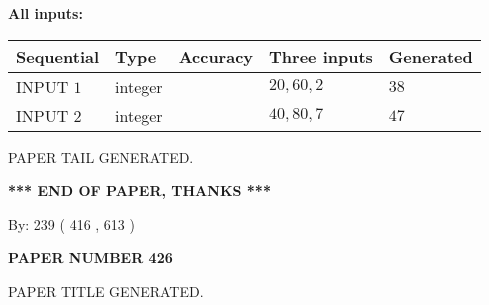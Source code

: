 \documentclass[12pt]{article}
\begin{document}
   
   
   
\noindent\vspace{0.1in}\hspace{-0.08in} {\textbf{\Large{All inputs: }}}
   
   
  
  
\noindent\begin{tabular}{|l|l|l|l|l|}
\hline
 Sequential & Type & Accuracy & Three inputs & Generated \\ 
\hline
 
 
  INPUT $  1 $ & integer &  & $
 20
 , 
 60
 , 
 2
 $ & $ 38 $ 
 \\  \hline  
 
 
  INPUT $  2 $ & integer &  & $
 40
 , 
 80
 , 
 7
 $ & $ 47 $ 
 \\  \hline  
 \end{tabular}
   
   
   
   
   
   
 \vspace{0.2in}
 
   
   
\vspace{2.0in} PAPER TAIL GENERATED.
   
   
   
   
\vspace{1.0in} 
{\textbf{\large{ *** END OF PAPER, THANKS *** }}} 
   
   
\hspace{1.0in} By: 
 239 ( 416 ,  613 )
   
   
   
   
\newpage 
\setcounter{page}{ 
   426001 } 
   
   
   
   
 {\textbf{ \Large{ PAPER NUMBER  426  }}}
   
   
\vspace{0.2in}
   
   
   
   
   
   
   
   
 \vspace{0.2in}
 
 
 
 
   
   
 PAPER TITLE GENERATED.
   
   
   
\vspace{0.2in}
   
\end{document}
